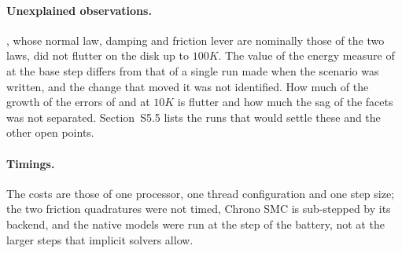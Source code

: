 \paragraph{Unexplained observations.} , whose normal law, damping and friction lever
are nominally those of the two laws, did not flutter on the disk up to $100K$. The value of the
energy measure of  at the base step differs from that of a single run made when
the scenario was written, and the change that moved it was not identified. How much of the
growth of the errors of  and  at $10K$ is flutter and how much the sag
of the facets was not separated. Section~S5.5 lists the runs that would settle these and the
other open points.

\paragraph{Timings.} The costs are those of one processor, one thread configuration and one
step size; the two friction quadratures were not timed, Chrono SMC is sub-stepped by its
backend, and the native models were run at the step of the battery, not at the larger steps
that implicit solvers allow.
